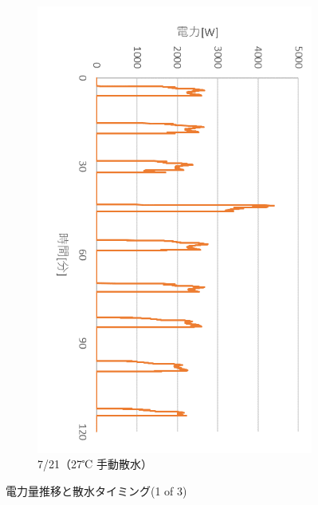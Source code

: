 \documentclass[a4j,fleqn,dvipdfmx,uplatex]{jsarticle}
\begin{document}
\begin{figure}[htb]
\begin{subfigure}[b]{0.42\linewidth}
    \includegraphics[width=\linewidth]{img/0721_power.png}
    \caption{7/21（27℃ 手動散水）}
  \end{subfigure}
  \caption{電力量推移と散水タイミング(1 of 3)}\label{fig2:ex_outputs_1/3}
\end{figure}
\end{document}
